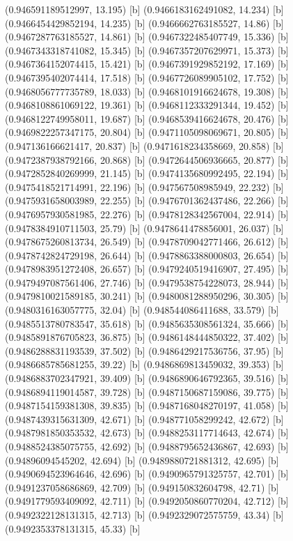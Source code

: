 {{{(0.946591189512997, 13.195) [b] 
(0.9466183162491082, 14.234) [b] 
(0.9466454429852194, 14.235) [b] 
(0.9466662763185527, 14.86) [b] 
(0.9467287763185527, 14.861) [b] 
(0.9467322485407749, 15.336) [b] 
(0.9467343318741082, 15.345) [b] 
(0.9467357207629971, 15.373) [b] 
(0.9467364152074415, 15.421) [b] 
(0.9467391929852192, 17.169) [b] 
(0.9467395402074414, 17.518) [b] 
(0.9467726089905102, 17.752) [b] 
(0.9468056777735789, 18.033) [b] 
(0.9468101916624678, 19.308) [b] 
(0.9468108861069122, 19.361) [b] 
(0.9468112333291344, 19.452) [b] 
(0.9468122749958011, 19.687) [b] 
(0.9468539416624678, 20.476) [b] 
(0.9469822257347175, 20.804) [b] 
(0.9471105098069671, 20.805) [b] 
(0.947136166621417, 20.837) [b] 
(0.9471618234358669, 20.858) [b] 
(0.9472387938792166, 20.868) [b] 
(0.9472644506936665, 20.877) [b] 
(0.9472852840269999, 21.145) [b] 
(0.9474135680992495, 22.194) [b] 
(0.9475418521714991, 22.196) [b] 
(0.947567508985949, 22.232) [b] 
(0.9475931658003989, 22.255) [b] 
(0.9476701362437486, 22.266) [b] 
(0.9476957930581985, 22.276) [b] 
(0.9478128342567004, 22.914) [b] 
(0.9478384910711503, 25.79) [b] 
(0.9478641478856001, 26.037) [b] 
(0.9478675260813734, 26.549) [b] 
(0.9478709042771466, 26.612) [b] 
(0.9478742824729198, 26.644) [b] 
(0.9478863388000803, 26.654) [b] 
(0.9478983951272408, 26.657) [b] 
(0.9479240519416907, 27.495) [b] 
(0.9479497087561406, 27.746) [b] 
(0.9479538754228073, 28.944) [b] 
(0.9479810021589185, 30.241) [b] 
(0.9480081288950296, 30.305) [b] 
(0.9480316163057775, 32.04) [b] 
(0.948544086411688, 33.579) [b] 
(0.9485513780783547, 35.618) [b] 
(0.9485635308561324, 35.666) [b] 
(0.9485891876705823, 36.875) [b] 
(0.9486148444850322, 37.402) [b] 
(0.9486288831193539, 37.502) [b] 
(0.9486429217536756, 37.95) [b] 
(0.9486685785681255, 39.22) [b] 
(0.9486869813459032, 39.353) [b] 
(0.9486883702347921, 39.409) [b] 
(0.9486890646792365, 39.516) [b] 
(0.9486894119014587, 39.728) [b] 
(0.9487150687159086, 39.775) [b] 
(0.9487154159381308, 39.835) [b] 
(0.9487168048270197, 41.058) [b] 
(0.9487439315631309, 42.671) [b] 
(0.948771058299242, 42.672) [b] 
(0.9487981850353532, 42.673) [b] 
(0.9488253117714643, 42.674) [b] 
(0.9488524385075755, 42.692) [b] 
(0.9488795652436867, 42.693) [b] 
(0.94896094545202, 42.694) [b] 
(0.9489880721881312, 42.695) [b] 
(0.9490694523964646, 42.696) [b] 
(0.9490965791325757, 42.701) [b] 
(0.9491237058686869, 42.709) [b] 
(0.949150832604798, 42.71) [b] 
(0.9491779593409092, 42.711) [b] 
(0.9492050860770204, 42.712) [b] 
(0.9492322128131315, 42.713) [b] 
(0.9492329072575759, 43.34) [b] 
(0.9492353378131315, 45.33) [b] 
}}}
